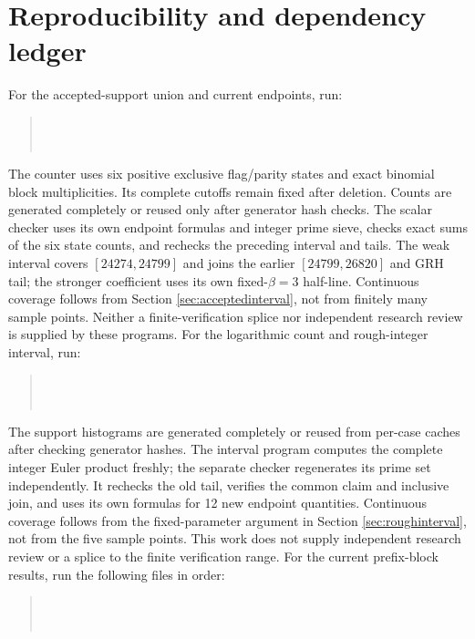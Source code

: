 \documentclass[11pt]{article}
\begin{document}
\section*{Reproducibility and dependency ledger}
For the accepted-support union and current endpoints, run:
\begin{quote}\small
{}\\
\\
\end{quote}
The counter uses six positive exclusive flag/parity states and exact
binomial block multiplicities. Its complete cutoffs remain fixed after
deletion. Counts are generated completely or reused only after generator
hash checks. The scalar checker uses its own endpoint formulas and
integer prime sieve, checks exact sums of the six state counts, and
rechecks the preceding interval and tails. The weak interval covers
$[24274,24799]$ and joins the earlier $[24799,26820]$ and GRH tail;
the stronger coefficient uses its own fixed-$\beta=3$ half-line.
Continuous coverage follows from Section \ref{sec:acceptedinterval},
not from finitely many sample points. Neither a finite-verification
splice nor independent research review is supplied by these programs.
For the logarithmic count and rough-integer interval, run:
\begin{quote}\small
{}\\
\\
\end{quote}
The support histograms are generated completely or reused from per-case
caches after checking generator hashes. The interval program computes the
complete integer Euler product freshly; the separate checker regenerates
its prime set independently. It rechecks the old tail, verifies the common
claim and inclusive join, and uses its own formulas for 12 new endpoint
quantities. Continuous coverage follows from the fixed-parameter argument
in Section \ref{sec:roughinterval}, not from the five sample points.
This work does not supply independent research review or a splice to the
finite verification range.
For the current prefix-block results, run the following files in order:
\begin{quote}\small
{}\\
\\
\end{quote}
\end{document}
